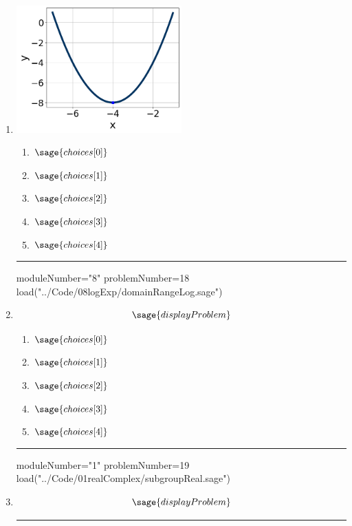 \documentclass[14pt]{extbook}
\newcommand{\litem}[1]{\item#1\hspace*{-1cm}\rule{\textwidth}{0.4pt}}
\begin{document}
\begin{enumerate}
  \litem{ 

   \begin{center}
       \includegraphics[width=0.5\textwidth]{../Figures/quadraticGraphToEquationA.png}
   \end{center}

  	\begin{enumerate}[label=\Alph*.]
    \item \( \sage{choices[0]} \)
    \item \( \sage{choices[1]} \)
    \item \( \sage{choices[2]} \)
    \item \( \sage{choices[3]} \)
    \item \( \sage{choices[4]} \)
  	\end{enumerate}
  }
\begin{sagesilent}
moduleNumber="8"
problemNumber=18
load("../Code/08logExp/domainRangeLog.sage")
\end{sagesilent}

\litem{ 

   \[ \sage{displayProblem} \]

  	\begin{enumerate}[label=\Alph*.]
    \item \( \sage{choices[0]} \)
    \item \( \sage{choices[1]} \)
    \item \( \sage{choices[2]} \)
    \item \( \sage{choices[3]} \)
    \item \( \sage{choices[4]} \)
  	\end{enumerate}
  }
\begin{sagesilent}
moduleNumber="1"
problemNumber=19
load("../Code/01realComplex/subgroupReal.sage")
\end{sagesilent}

\litem{ 

   \[ \sage{displayProblem} \]

}
\end{enumerate}
\end{document}
